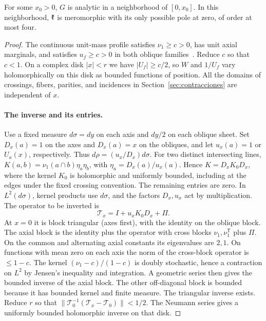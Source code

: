 \begin{lema}\label{lem:regularidad-extremo}
For some \(x_0>0\), \(G\) is analytic in a neighborhood of \([0,x_0]\). In this neighborhood, \(\mathfrak{k}\)
is meromorphic with its only possible pole at zero, of order at most four.
\end{lema}
\begin{proof}
The continuous unit-mass profile satisfies \(\nu_1\ge c>0\), has unit axial marginals, and satisfies
\(u_f\ge c>0\) in both oblique families~\cite{pv}. Reduce \(c\) so that \(c<1\). On a complex disk
\(|x|<r\) we have \(|U_f|\ge c/2\), so \(W\) and \(1/U_f\) vary holomorphically on this disk as bounded
functions of position. All the domains of crossings, fibers, parities, and incidences in
Section~\ref{sec:contracciones} are independent of \(x\).

\paragraph{The inverse and its entries.}
Use a fixed measure \(d\sigma=dy\) on each axis and \(dy/2\) on each oblique sheet. Set \(D_x(a)=1\) on
the axes and \(D_x(a)=x\) on the obliques, and let \(u_x(a)=1\) or \(U_a(x)\), respectively. Thus
\(d\rho=(u_x/D_x)d\sigma\). For two distinct intersecting lines, \(K(a,b)=\nu_1(a\cap b)\eta_a\eta_b\),
with \(\eta_a=D_x(a)/u_x(a)\). Hence \(K=D_x K_0 D_x\), where the kernel \(K_0\) is holomorphic and
uniformly bounded, including at the edges under the fixed crossing convention. The remaining entries are
zero. In \(L^2(d\sigma)\), kernel products use \(d\sigma\), and the factors \(D_x,u_x\) act by
multiplication. The operator to be inverted is
\[
 \mathcal T_x=I+u_x K_0D_x+\Pi .
\]
At \(x=0\) it is block triangular (axes first), with the identity on the oblique block. The axial block
is the identity plus the operator with cross blocks \(\nu_1,\nu_1^{\mathsf T}\) plus \(\Pi\). On the
common and alternating axial constants its eigenvalues are \(2,1\). On functions with mean zero on each
axis the norm of the cross-block operator is \(\le1-c\). The kernel \((\nu_1-c)/(1-c)\) is doubly
stochastic, hence a contraction on \(L^2\) by Jensen's inequality and integration. A geometric series
then gives the bounded inverse of the axial block. The other off-diagonal block is bounded because it has
bounded kernel and finite measure. The triangular inverse exists. Reduce \(r\) so that \(\|\mathcal
T_0^{-1}(\mathcal T_x-\mathcal T_0)\|<1/2\). The Neumann series gives a uniformly bounded holomorphic
inverse on that disk.


\end{proof}
